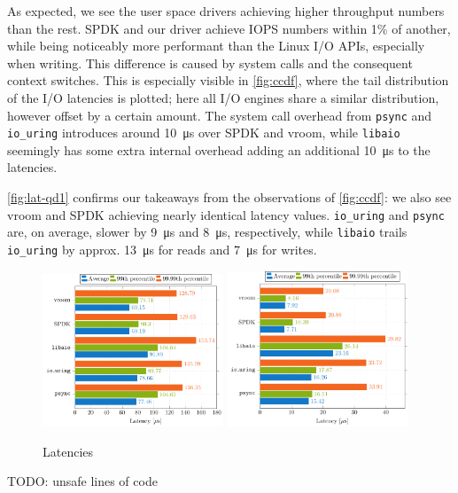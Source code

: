 As expected, we see the user space drivers achieving higher throughput numbers than the rest. SPDK and our driver achieve IOPS numbers within 1\% of another, while being noticeably more performant than the Linux I/O APIs, especially when writing. This difference is caused by system calls and the consequent context switches. This is especially visible in \autoref{fig:ccdf}, where the tail distribution of the I/O latencies is plotted; here all I/O engines share a similar distribution, however offset by a certain amount. The system call overhead from \texttt{psync} and \texttt{io\_uring} introduces around \qty{10}{\micro\second} over SPDK and vroom, while \texttt{libaio} seemingly has some extra internal overhead adding an additional \qty{10}{\micro\second} to the latencies.

\autoref{fig:lat-qd1} confirms our takeaways from the observations of \autoref{fig:ccdf}: we also see vroom and SPDK achieving nearly identical latency values. \texttt{io\_uring} and \texttt{psync} are, on average, slower by \qty{9}{\micro\second} and \qty{8}{\micro\second}, respectively, while \texttt{libaio} trails \texttt{io\_uring} by approx. \qty{13}{\micro\second} for reads and \qty{7}{\micro\second} for writes.

\begin{figure}
  \centering
   {\includegraphics[width=0.48\textwidth]{figures/latency-read-xbar} \label{fig:lat-read}}
   {\includegraphics[width=0.48\textwidth]{figures/latency-write-xbar} \label{fig:lat-write}}
  \caption{Latencies}
  \label{fig:lat-qd1}
\end{figure}

TODO: unsafe lines of code
